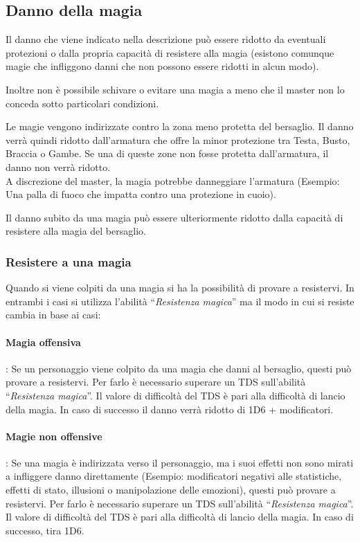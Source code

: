 \documentclass[../manuale_main.tex]{subfiles}
\begin{document}
\subsection{Danno della magia}
Il danno che viene indicato nella descrizione può essere ridotto da eventuali protezioni o dalla propria capacità di resistere alla magia (esistono comunque magie che infliggono danni che non possono essere ridotti in alcun modo).

Inoltre non è possibile schivare o evitare una magia a meno che il master non lo conceda sotto particolari condizioni.

Le magie vengono indirizzate contro la zona meno protetta del bersaglio. Il danno verrà quindi ridotto dall'armatura che offre la minor protezione tra Testa, Busto, Braccia o Gambe. Se una di queste zone non fosse protetta dall'armatura, il danno non verrà ridotto.\\
A discrezione del master, la magia potrebbe danneggiare l'armatura (Esempio: Una palla di fuoco che impatta contro una protezione in cuoio).

Il danno subito da una magia può essere ulteriormente ridotto dalla capacità di resistere alla magia del bersaglio.


\subsubsection{Resistere a una magia}
Quando si viene colpiti da una magia si ha la possibilità di provare a resistervi. In entrambi i casi si utilizza l'abilità ``\emph{Resistenza magica}'' ma il modo in cui si resiste cambia in base ai casi:
\paragraph{\textbf{Magia offensiva}}: Se un personaggio viene colpito da una magia che danni al bersaglio, questi può provare a resistervi. Per farlo è necessario superare un TDS sull'abilità ``\emph{Resistenza magica}''. Il valore di difficoltà del TDS è pari alla difficoltà di lancio della magia. In caso di successo il danno verrà ridotto di 1D6 + modificatori.
\paragraph{\textbf{Magie non offensive}}: Se una magia è indirizzata verso il personaggio, ma i suoi effetti non sono mirati a infliggere danno direttamente (Esempio: modificatori negativi alle statistiche, effetti di stato, illusioni o manipolazione delle emozioni), questi può provare a resistervi. Per farlo è necessario superare un TDS sull’abilità ``\emph{Resistenza magica}''. Il valore di difficoltà del TDS è pari alla difficoltà di lancio della magia. In caso di successo, tira 1D6.
\end{document}
